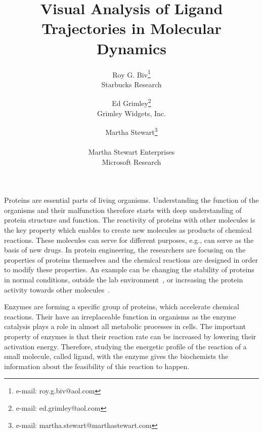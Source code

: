 \documentclass{vgtc}                          %
\title{Visual Analysis of Ligand Trajectories in Molecular Dynamics}
\author{Roy G. Biv\thanks{e-mail: roy.g.biv@aol.com}\\ %
        \scriptsize Starbucks Research %
\and Ed Grimley\thanks{e-mail: ed.grimley@aol.com}\\ %
     \scriptsize Grimley Widgets, Inc. %
\and Martha Stewart\thanks{e-mail: martha.stewart@marthastewart.com}\\ %
     \parbox{1.4in}{\scriptsize \centering Martha Stewart Enterprises \\ Microsoft Research}}
\begin{document}


\maketitle


Proteins are essential parts of living organisms. 
Understanding the function of the organisms and their malfunction therefore starts with deep understanding of protein structure and function.
The reactivity of proteins with other molecules is the key property which enables to create new molecules as products of chemical reactions. 
These molecules can serve for different purposes, e.g., can serve as the basis of new drugs. 
In protein engineering, the researchers are focusing on the properties of proteins themselves and the chemical reactions are designed in order to modify these properties. 
An example can be changing the stability of proteins in normal conditions, outside the lab environment~\cite{koudelakova}, or increasing the protein activity towards other molecules~\cite{pavlova}.

Enzymes are forming a specific group of proteins, which accelerate chemical reactions. 
Their have an irreplaceable function in organisms as the enzyme catalysis plays a role in almost all metabolic processes in cells.
The important property of enzymes is that their reaction rate can be increased by lowering their activation energy.
Therefore, studying the energetic profile of the reaction of a small molecule, called ligand, with the enzyme gives the biochemists the information about the feasibility of this reaction to happen.
\end{document}

